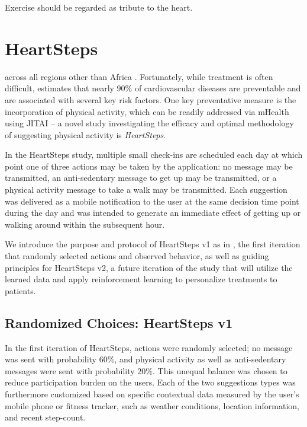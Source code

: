 \begin{savequote}[75mm]
Exercise should be regarded as tribute to the heart.
\end{savequote}

\chapter{HeartSteps}

 across all regions other than Africa \citep{WorldHealth2012}.  Fortunately, while treatment is often difficult, \citet{McGill2008} estimates that nearly $90\%$ of cardiovascular diseases are preventable and are associated with several key risk factors.  One key preventative measure is the incorporation of physical activity, which can be readily addressed via mHealth using JITAI -- a novel study investigating the efficacy and optimal methodology of suggesting physical activity is {\it HeartSteps}.

In the HeartSteps study, multiple small check-ins are scheduled each day at which point one of three actions may be taken by the application: no message may be transmitted, an anti-sedentary message to get up may be transmitted, or a physical activity message to take a walk may be transmitted.  Each suggestion was delivered as a mobile notification to the user at the same decision time point during the day and was intended to generate an immediate effect of getting up or walking around within the subsequent hour.

We introduce the purpose and protocol of HeartSteps v1 as in \citet{Smith2017}, the first iteration that randomly selected actions and observed behavior, as well as guiding principles for HeartSteps v2, a future iteration of the study that will utilize the learned data and apply reinforcement learning to personalize treatments to patients.



\section{Randomized Choices: HeartSteps v1}

In the first iteration of HeartSteps, actions were randomly selected; no message was sent with probability $60\%$, and physical activity as well as anti-sedentary messages were sent with probability $20\%$.  This unequal balance was chosen to reduce participation burden on the users.  Each of the two suggestions types was furthermore customized based on specific contextual data measured by the user's mobile phone or fitness tracker, such as weather conditions, location information, and recent step-count.

